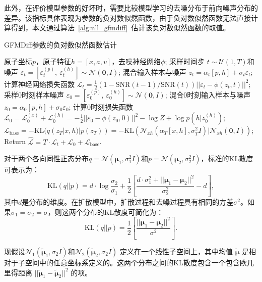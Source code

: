 此外，在评价模型参数的好坏时，需要比较模型学习的去噪分布于前向噪声分布的差异。该指标具体表现为参数的负对数似然函数，由于负对数似然函数无法直接计算得到，本文通过算法~\ref{alg:nll_gfmdiff}~估计该负对数似然函数的取值。

\begin{algorithm}[H]
    \caption{GFMDiff参数的负对数似然函数估计}
    \label{alg:nll_gfmdiff}
    \begin{algorithmic}
     原子坐标$p$，原子特征$h = [x, a, v]$，去噪神经网络$\phi$;
    \STATE 采样时间步 $t \sim \mathcal{U}(1, T)$和噪声 $\varepsilon_t = [\varepsilon^{(p)}_t, ~\varepsilon^{(h)}_t] \sim \mathcal{N}(\mathbf{0}, I)$;
    \STATE 混合输入样本与噪声 $z_t = \alpha_t [p, h] + \sigma_t \varepsilon_t$;
    \STATE 计算神经网络损失函数 $\mathcal{L}_t = \frac{1}{2}(1 - \mathrm{SNR}(t-1) / \mathrm{SNR}(t)) ||\varepsilon_t - \phi(z_t, t)||^2$;
    \STATE 采样0时刻样本噪声 $\varepsilon_0 = [\varepsilon^{(p)}_0, ~\varepsilon^{(h)}_0] \sim \mathcal{N}(\mathbf{0}, I)$;
    \STATE 混合0时刻输入样本与噪声 $z_0 = \alpha_0 [p, h] + \sigma_0 \varepsilon_0$;
    \STATE 计算0时刻损失函数 $\mathcal{L}_0 = \mathcal{L}_0^{(x)} + \mathcal{L}_0^{(h)} = -\frac{1}{2} ||\varepsilon_0 - \phi(z_0, 0)||^2 - \log Z + \log p(h | z_0^{(h)})$;
    \STATE $\mathcal{L}_{\text{base}} = -\mathrm{KL}(q(z_T | x, h) | p(z_T)) = -\mathrm{KL}(\mathcal{N}_{xh}(\alpha_T [x, h], \sigma_T^2 I) | \mathcal{N}_{xh}(\mathbf{0}, I))$;
    \STATE Return $\hat{\mathcal{L}} = T \cdot \mathcal{L}_t + \mathcal{L}_0 + \mathcal{L}_{\text{base}}$.
    \end{algorithmic}
\end{algorithm}

对于两个各向同性正态分布$q = \mathcal{N}(\mathbf{\mu}_1, \sigma_1^2 I)$和$p = \mathcal{N}(\mathbf{\mu}_2, \sigma_2^2 I)$，标准的KL散度可表示为：
\begin{equation}
    \mathrm{KL}(q || p) = d \cdot \log \frac{\sigma_2}{\sigma_1} + \frac{1}{2} \left[ \frac{d \cdot \sigma_1^2 + ||\mathbf{\mu}_1 - \mathbf{\mu}_2||^2}{\sigma_2^2} - d  \right],
\end{equation}
其中$d$是分布的维度。在扩散模型中，扩散过程和去噪过程具有相同的方差$\sigma^2$。如果$\sigma_1 = \sigma_2 = \sigma$，则这两个分布的KL散度可简化为：
\begin{equation}
    \mathrm{KL}(q || p) = \frac{1}{2} \left[ \frac{||\mathbf{\mu}_1 - \mathbf{\mu}_2||^2}{\sigma^2} \right].
\end{equation}

现假设$\mathcal{N}_1(\tilde{\mathbf{\mu}}_1, \sigma_2 I)$和$\mathcal{N}_2(\tilde{\mathbf{\mu}}_2, \sigma_2 I)$ 定义在一个线性子空间上，其中均值 $\tilde{\mathbf{\mu}}$ 是相对于子空间中的任意坐标系定义的。这两个分布之间的KL散度包含一个包含欧几里得距离 $||\tilde{\mathbf{\mu}}_1 - \tilde{\mathbf{\mu}}_2||^2$ 的项。


